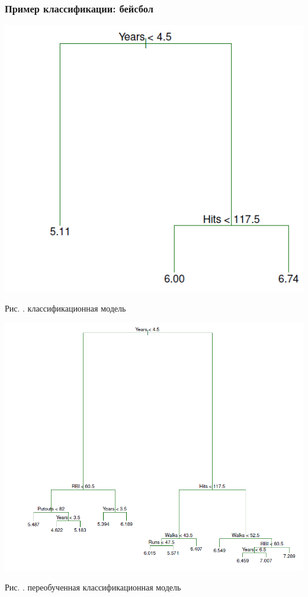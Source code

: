 \documentclass[pdf, 9pt, usenames, dvipsnames, unicode, hyperref={bookmarks=true,bookmarksopen=false, bookmarksnumbered}]{beamer}
\begin{document}

\begin{frame}\frametitle{Пример классификации: бейсбол}

	\begin{center}
	\includegraphics[scale=0.3]{pic62}
    \end{center}

	\begin{center}
	Рис. . классификационная модель
    \end{center}

    \begin{center}
	\includegraphics[scale=0.2]{pic63}
    \end{center}

    \begin{center}
	Рис. . переобученная классификационная модель
    \end{center}


\end{frame}
\end{document}
